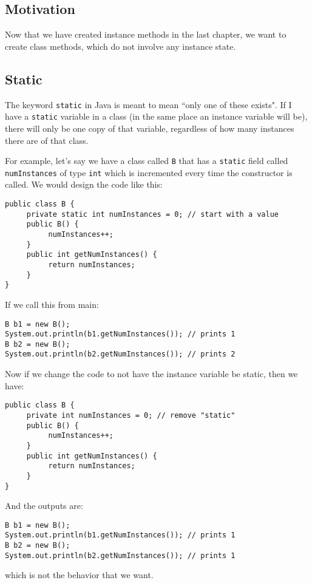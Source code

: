 
\subsection{Motivation}
Now that we have created instance methods in the last chapter, we want to create class methods, which do not involve any instance state.

\subsection{Static}
The keyword \verb|static| in Java is meant to mean ``only one of these exists". If I have a \verb|static| variable in a class (in the same place an instance variable will be), there will only be one copy of that variable, regardless of how many instances there are of that class.

\par For example, let's say we have a class called \verb|B| that has a \verb|static| field called \verb|numInstances| of type \verb|int| which is incremented every time the constructor is called. We would design the code like this:
\begin{lstlisting}
public class B {
     private static int numInstances = 0; // start with a value
     public B() {
          numInstances++;
     }
     public int getNumInstances() {
          return numInstances;
     }
}
\end{lstlisting}
If we call this from main:
\begin{lstlisting}
B b1 = new B();
System.out.println(b1.getNumInstances()); // prints 1
B b2 = new B();
System.out.println(b2.getNumInstances()); // prints 2
\end{lstlisting}
Now if we change the code to not have the instance variable be static, then we have:
\begin{lstlisting}
public class B {
     private int numInstances = 0; // remove "static"
     public B() {
          numInstances++;
     }
     public int getNumInstances() {
          return numInstances;
     }
}
\end{lstlisting}
And the outputs are:
\begin{lstlisting}
B b1 = new B();
System.out.println(b1.getNumInstances()); // prints 1
B b2 = new B();
System.out.println(b2.getNumInstances()); // prints 1
\end{lstlisting}
which is not the behavior that we want.

